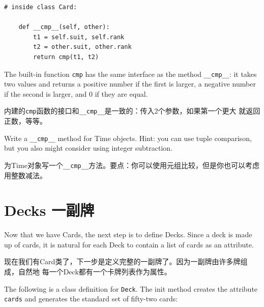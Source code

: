 \documentclass[10pt]{book}
\begin{document}
\begin{CJK}{UTF8}{gbsn}
\begin{verbatim}
# inside class Card:

    def __cmp__(self, other):
        t1 = self.suit, self.rank
        t2 = other.suit, other.rank
        return cmp(t1, t2)
\end{verbatim}
%
The built-in function {\tt cmp} has the same interface as
the method \verb"__cmp__": it takes two values and returns
a positive number if the first is larger, a negative number
if the second is larger, and 0 if they are equal.

内建的{\tt cmp}函数的接口和\verb"__cmp__"是一致的：传入2个参数，如果第一个更大
就返回正数，等等。

\begin{exercise}

Write a \verb"__cmp__" method for Time objects.  Hint: you
can use tuple comparison, but you also might consider using
integer subtraction.

为Time对象写一个\verb"__cmp__"方法。要点：你可以使用元组比较，但是你也可以考虑
用整数减法。



\end{exercise}


\section{Decks 一副牌}

Now that we have Cards, the next step is to define Decks.  Since a
deck is made up of cards, it is natural for each Deck to contain a
list of cards as an attribute.

现在我们有Card类了，下一步是定义完整的一副牌了。因为一副牌由许多牌组成，自然地
每一个Deck都有一个卡牌列表作为属性。

The following is a class definition for {\tt Deck}.  The
init method creates the attribute {\tt cards} and generates
the standard set of fifty-two cards:


\end{CJK}
\end{document}
